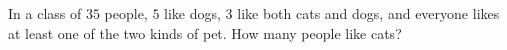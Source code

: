 In a class of $35$ people, $5$ like dogs, $3$ like both cats and dogs, and everyone likes at least one of the two kinds of pet. How many people like cats?
